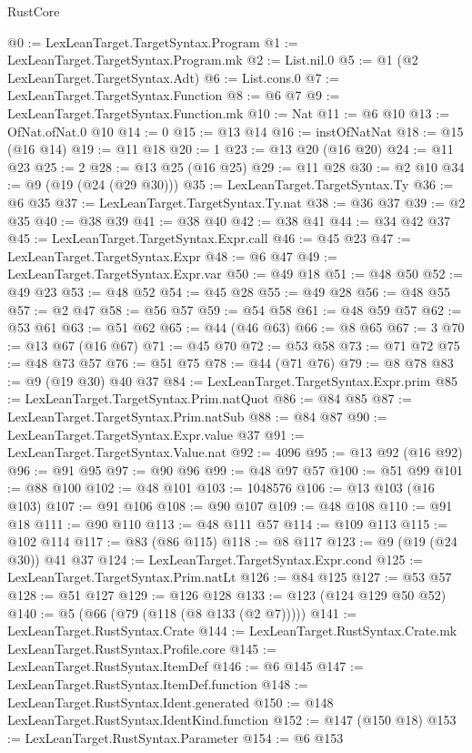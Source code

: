 \begin{lexlean}{RustCore}
\begin{coremodule}
@0 := LexLeanTarget.TargetSyntax.Program
@1 := LexLeanTarget.TargetSyntax.Program.mk
@2 := List.nil.{0}
@5 := @1 (@2 LexLeanTarget.TargetSyntax.Adt)
@6 := List.cons.{0}
@7 := LexLeanTarget.TargetSyntax.Function
@8 := @6 @7
@9 := LexLeanTarget.TargetSyntax.Function.mk
@10 := Nat
@11 := @6 @10
@13 := OfNat.ofNat.{0} @10
@14 := 0
@15 := @13 @14
@16 := instOfNatNat
@18 := @15 (@16 @14)
@19 := @11 @18
@20 := 1
@23 := @13 @20 (@16 @20)
@24 := @11 @23
@25 := 2
@28 := @13 @25 (@16 @25)
@29 := @11 @28
@30 := @2 @10
@34 := @9 (@19 (@24 (@29 @30)))
@35 := LexLeanTarget.TargetSyntax.Ty
@36 := @6 @35
@37 := LexLeanTarget.TargetSyntax.Ty.nat
@38 := @36 @37
@39 := @2 @35
@40 := @38 @39
@41 := @38 @40
@42 := @38 @41
@44 := @34 @42 @37
@45 := LexLeanTarget.TargetSyntax.Expr.call
@46 := @45 @23
@47 := LexLeanTarget.TargetSyntax.Expr
@48 := @6 @47
@49 := LexLeanTarget.TargetSyntax.Expr.var
@50 := @49 @18
@51 := @48 @50
@52 := @49 @23
@53 := @48 @52
@54 := @45 @28
@55 := @49 @28
@56 := @48 @55
@57 := @2 @47
@58 := @56 @57
@59 := @54 @58
@61 := @48 @59 @57
@62 := @53 @61
@63 := @51 @62
@65 := @44 (@46 @63)
@66 := @8 @65
@67 := 3
@70 := @13 @67 (@16 @67)
@71 := @45 @70
@72 := @53 @58
@73 := @71 @72
@75 := @48 @73 @57
@76 := @51 @75
@78 := @44 (@71 @76)
@79 := @8 @78
@83 := @9 (@19 @30) @40 @37
@84 := LexLeanTarget.TargetSyntax.Expr.prim
@85 := LexLeanTarget.TargetSyntax.Prim.natQuot
@86 := @84 @85
@87 := LexLeanTarget.TargetSyntax.Prim.natSub
@88 := @84 @87
@90 := LexLeanTarget.TargetSyntax.Expr.value @37
@91 := LexLeanTarget.TargetSyntax.Value.nat
@92 := 4096
@95 := @13 @92 (@16 @92)
@96 := @91 @95
@97 := @90 @96
@99 := @48 @97 @57
@100 := @51 @99
@101 := @88 @100
@102 := @48 @101
@103 := 1048576
@106 := @13 @103 (@16 @103)
@107 := @91 @106
@108 := @90 @107
@109 := @48 @108
@110 := @91 @18
@111 := @90 @110
@113 := @48 @111 @57
@114 := @109 @113
@115 := @102 @114
@117 := @83 (@86 @115)
@118 := @8 @117
@123 := @9 (@19 (@24 @30)) @41 @37
@124 := LexLeanTarget.TargetSyntax.Expr.cond
@125 := LexLeanTarget.TargetSyntax.Prim.natLt
@126 := @84 @125
@127 := @53 @57
@128 := @51 @127
@129 := @126 @128
@133 := @123 (@124 @129 @50 @52)
@140 := @5 (@66 (@79 (@118 (@8 @133 (@2 @7)))))
@141 := LexLeanTarget.RustSyntax.Crate
@144 := LexLeanTarget.RustSyntax.Crate.mk LexLeanTarget.RustSyntax.Profile.core
@145 := LexLeanTarget.RustSyntax.ItemDef
@146 := @6 @145
@147 := LexLeanTarget.RustSyntax.ItemDef.function
@148 := LexLeanTarget.RustSyntax.Ident.generated
@150 := @148 LexLeanTarget.RustSyntax.IdentKind.function
@152 := @147 (@150 @18)
@153 := LexLeanTarget.RustSyntax.Parameter
@154 := @6 @153

\end{coremodule}
\end{lexlean}
